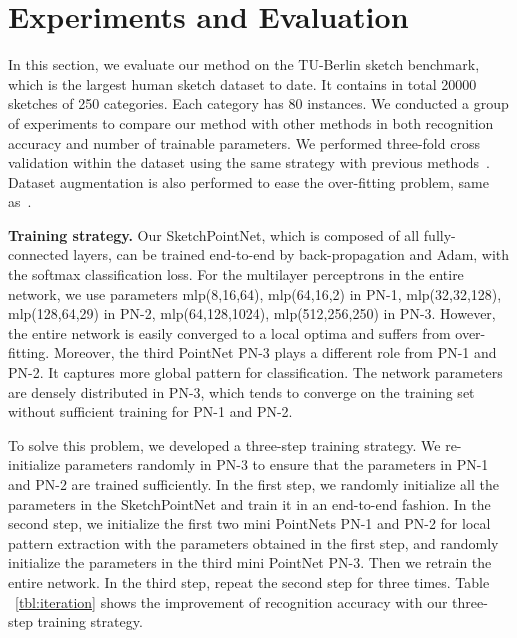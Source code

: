 \section{Experiments and Evaluation}
\label{sec:experiments}

In this section, we evaluate our method on the TU-Berlin sketch benchmark, which is the largest human sketch dataset to date.
%
It contains in total 20000 sketches of 250 categories. Each category has 80 instances.
%
We conducted a group of experiments to compare our method with other methods in both recognition accuracy and number of trainable parameters.
%
We performed three-fold cross validation within the dataset using
the same strategy with previous methods~\cite{Yu2015SketchaNetTB, Dupont2016DeepSketch2D}.
Dataset augmentation is also performed to ease the over-fitting problem, same as~\cite{Yu2015SketchaNetTB}.


\noindent \textbf{Training strategy.}
%
Our SketchPointNet, which is composed of all fully-connected layers, can be trained end-to-end by back-propagation and Adam, with the softmax classification loss.
%
For the multilayer perceptrons in the entire network, we use parameters mlp(8,16,64), mlp(64,16,2) in PN-1, mlp(32,32,128), mlp(128,64,29) in PN-2, mlp(64,128,1024), mlp(512,256,250) in PN-3.
%
However, the entire network is easily converged to a local optima and suffers from over-fitting.
Moreover, the third PointNet PN-3 plays a different role from PN-1 and PN-2. It captures more global pattern for classification.
%
The network parameters are densely distributed in PN-3, which tends to converge on the training set without sufficient training for PN-1 and PN-2.


To solve this problem, we developed a three-step training strategy.
%
We re-initialize parameters randomly in PN-3 to ensure that the parameters in PN-1 and PN-2 are trained sufficiently.
%
In the first step, we randomly initialize all the parameters in the SketchPointNet and train it in an end-to-end fashion.
%
In the second step, we initialize the first two mini PointNets PN-1 and PN-2 for local pattern extraction with the parameters obtained in the first step, and randomly initialize the parameters in the third mini PointNet PN-3. Then we retrain the entire network.
%
In the third step, repeat the second step for three times.
%
Table ~\ref{tbl:iteration} shows the improvement of recognition accuracy with our three-step training strategy.

